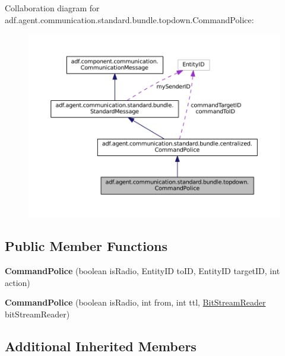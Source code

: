 Collaboration diagram for adf.\+agent.\+communication.\+standard.\+bundle.\+topdown.\+Command\+Police\+:
\nopagebreak
\begin{figure}[H]
\begin{center}
\leavevmode
\includegraphics[width=350pt]{classadf_1_1agent_1_1communication_1_1standard_1_1bundle_1_1topdown_1_1CommandPolice__coll__graph}
\end{center}
\end{figure}
\subsection*{Public Member Functions}
\begin{DoxyCompactItemize}
\item 
\hypertarget{classadf_1_1agent_1_1communication_1_1standard_1_1bundle_1_1topdown_1_1CommandPolice_aa8cda9c94c7876cbd37c15925411aa23}{}\label{classadf_1_1agent_1_1communication_1_1standard_1_1bundle_1_1topdown_1_1CommandPolice_aa8cda9c94c7876cbd37c15925411aa23} 
{\bfseries Command\+Police} (boolean is\+Radio, Entity\+ID to\+ID, Entity\+ID target\+ID, int action)
\item 
\hypertarget{classadf_1_1agent_1_1communication_1_1standard_1_1bundle_1_1topdown_1_1CommandPolice_afdeb2bff9db87a9436ffb6171a437a16}{}\label{classadf_1_1agent_1_1communication_1_1standard_1_1bundle_1_1topdown_1_1CommandPolice_afdeb2bff9db87a9436ffb6171a437a16} 
{\bfseries Command\+Police} (boolean is\+Radio, int from, int ttl, \hyperlink{classadf_1_1component_1_1communication_1_1util_1_1BitStreamReader}{Bit\+Stream\+Reader} bit\+Stream\+Reader)
\end{DoxyCompactItemize}
\subsection*{Additional Inherited Members}


